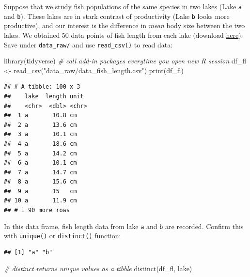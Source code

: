\documentclass[
]{article}
\newenvironment{Shaded}{\begin{snugshade}}{\end{snugshade}}
\newcommand{\CommentTok}[1]{\textcolor[rgb]{0.56,0.35,0.01}{\textit{#1}}}
\newcommand{\FunctionTok}[1]{\textcolor[rgb]{0.00,0.00,0.00}{#1}}
\newcommand{\NormalTok}[1]{#1}
\newcommand{\OtherTok}[1]{\textcolor[rgb]{0.56,0.35,0.01}{#1}}
\newcommand{\SpecialCharTok}[1]{\textcolor[rgb]{0.00,0.00,0.00}{#1}}
\newcommand{\StringTok}[1]{\textcolor[rgb]{0.31,0.60,0.02}{#1}}
\begin{document}
Suppose that we study fish populations of the same species in two lakes (Lake \texttt{a} and \texttt{b}). These lakes are in stark contrast of productivity (Lake \texttt{b} looks more productive), and our interest is the difference in \emph{mean} body size between the two lakes. We obtained \(50\) data points of fish length from each lake (download \href{https://github.com/aterui/biostats/blob/master/data_raw/data_fish_length.csv}{here}). Save under \texttt{data\_raw/} and use \texttt{read\_csv()} to read data:

\begin{Shaded}
\begin{Highlighting}[]
\FunctionTok{library}\NormalTok{(tidyverse) }\CommentTok{\# call add{-}in packages everytime you open new R session}
\NormalTok{df\_fl }\OtherTok{\textless{}{-}} \FunctionTok{read\_csv}\NormalTok{(}\StringTok{"data\_raw/data\_fish\_length.csv"}\NormalTok{)}
\FunctionTok{print}\NormalTok{(df\_fl)}
\end{Highlighting}
\end{Shaded}

\begin{verbatim}
## # A tibble: 100 x 3
##    lake  length unit 
##    <chr>  <dbl> <chr>
##  1 a       10.8 cm   
##  2 a       13.6 cm   
##  3 a       10.1 cm   
##  4 a       18.6 cm   
##  5 a       14.2 cm   
##  6 a       10.1 cm   
##  7 a       14.7 cm   
##  8 a       15.6 cm   
##  9 a       15   cm   
## 10 a       11.9 cm   
## # i 90 more rows
\end{verbatim}

In this data frame, fish length data from lake \texttt{a} and \texttt{b} are recorded. Confirm this with \texttt{unique()} or \texttt{distinct()} function:

\begin{Shaded}
\end{Shaded}

\begin{verbatim}
## [1] "a" "b"
\end{verbatim}

\begin{Shaded}
\begin{Highlighting}[]
\CommentTok{\# distinct returns unique values as a tibble}
\FunctionTok{distinct}\NormalTok{(df\_fl, lake)}
\end{Highlighting}
\end{Shaded}
\end{document}
